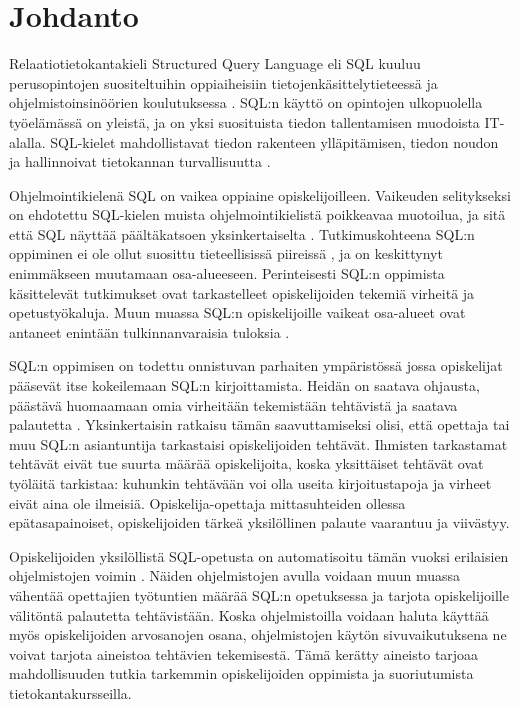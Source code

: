 \documentclass[finnish,twoside,openright]{HYgraduMLDS}
\begin{document}
\chapter{Johdanto}

Relaatiotietokantakieli Structured Query Language eli SQL kuuluu perusopintojen suositeltuihin oppiaiheisiin tietojenkäsittelytieteessä \cite{acm2013currilum} ja ohjelmistoinsinöörien koulutuksessa \cite{swebok}. SQL:n käyttö on opintojen ulkopuolella työelämässä on yleistä, ja on yksi suosituista tiedon tallentamisen muodoista IT-alalla. SQL-kielet mahdollistavat tiedon rakenteen ylläpitämisen, tiedon noudon ja hallinnoivat tietokannan turvallisuutta \cite{wilton2005beginning}.

Ohjelmointikielenä SQL on vaikea oppiaine opiskelijoilleen. Vaikeuden selitykseksi on ehdotettu SQL-kielen muista ohjelmointikielistä poikkeavaa muotoilua, ja sitä että SQL näyttää päältäkatsoen yksinkertaiselta \cite{sadiq2004sqlator}. Tutkimuskohteena SQL:n oppiminen ei ole ollut suosittu tieteellisissä piireissä \cite{Taipalus:2019:EFS:3287324.3287359}, ja on keskittynyt enimmäkseen muutamaan osa-alueeseen. Perinteisesti SQL:n oppimista käsittelevät tutkimukset ovat tarkastelleet opiskelijoiden tekemiä virheitä ja opetustyökaluja. Muun muassa SQL:n opiskelijoille vaikeat osa-alueet ovat antaneet enintään tulkinnanvaraisia tuloksia \cite{Taipalus:2019:EFS:3287324.3287359}.

SQL:n oppimisen on todettu onnistuvan parhaiten ympäristössä jossa opiskelijat pääsevät itse kokeilemaan SQL:n kirjoittamista. Heidän on saatava ohjausta, päästävä huomaamaan omia virheitään tekemistään tehtävistä ja saatava palautetta \cite{sadiq2004sqlator}. Yksinkertaisin ratkaisu tämän saavuttamiseksi olisi, että opettaja tai muu SQL:n asiantuntija tarkastaisi opiskelijoiden tehtävät. Ihmisten tarkastamat tehtävät eivät tue suurta määrää opiskelijoita, koska yksittäiset tehtävät ovat työläitä tarkistaa: kuhunkin tehtävään voi olla useita kirjoitustapoja ja virheet eivät aina ole ilmeisiä. Opiskelija-opettaja mittasuhteiden ollessa epätasapainoiset, opiskelijoiden tärkeä yksilöllinen palaute vaarantuu ja viivästyy.

Opiskelijoiden yksilöllistä SQL-opetusta on automatisoitu tämän vuoksi erilaisien ohjelmistojen voimin \cite{sadiq2004sqlator}. Näiden ohjelmistojen avulla voidaan muun muassa vähentää opettajien työtuntien määrää SQL:n opetuksessa ja tarjota opiskelijoille välitöntä palautetta tehtävistään. Koska ohjelmistoilla voidaan haluta käyttää myös opiskelijoiden arvosanojen osana, ohjelmistojen käytön sivuvaikutuksena ne voivat tarjota aineistoa tehtävien tekemisestä. Tämä kerätty aineisto tarjoaa mahdollisuuden tutkia tarkemmin opiskelijoiden oppimista ja suoriutumista tietokantakursseilla.
\end{document}
